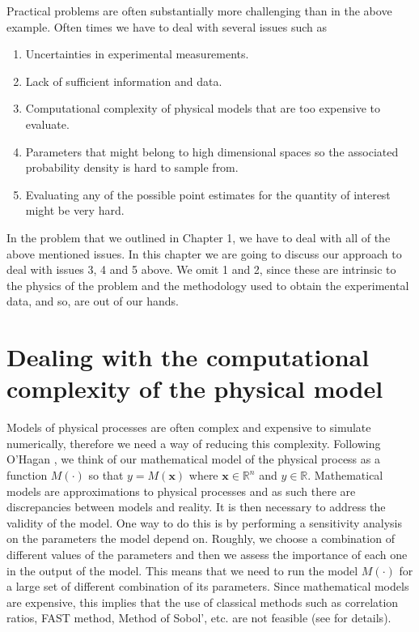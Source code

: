 \documentclass[12pt]{book}
\newcommand{\x}{\textbf{x}}
\begin{document}
Practical problems are often substantially more challenging than in the above example. Often times we have to 
deal with several issues such as 

\begin{enumerate}
\item Uncertainties in experimental measurements.
\item Lack of sufficient information and data.
\item Computational complexity of  physical models that are too expensive to evaluate.
\item Parameters that might belong to high dimensional spaces so the associated probability density is 
hard to sample from.
\item Evaluating any of the possible point estimates for the quantity of interest might be very hard.
\end{enumerate}
In the problem that we outlined in  Chapter 1, we have to deal with all of  the above mentioned issues.
In this chapter we are going to discuss our approach to deal with issues 3, 4 and 5 above. We 
omit 1 and 2, since these  are intrinsic to the physics of the problem and   the methodology used 
to obtain the experimental data, and so, are out of our hands.


\section{Dealing with  the computational complexity of the physical model}
Models of physical processes are often complex and   expensive to simulate numerically, therefore we need
a way of reducing this complexity.
Following O'Hagan  \cite{o2006bayesian}, we think of our  mathematical model of the physical process
 as a function
$M(\cdot)$ so that $y=M(\x)$ where $\x\in\mathbb{R}^{n}$   and $y\in\mathbb{R}$.
Mathematical models are approximations to physical processes and as such there are discrepancies between
models and reality. It is then necessary to address the validity  of the model. One way to do
this is by performing a sensitivity analysis on the parameters the model depend on. Roughly, we choose a
combination of different values of the parameters and then we assess the importance of each one in
the output of the model. This means that we need to run the model $M(\cdot)$ for a large set 
of different combination of its parameters.
Since mathematical models are expensive,
this implies that   the  use of   classical methods such  as correlation
ratios, FAST method, Method of Sobol', etc. 
 are not feasible (see \cite{saltelli2000sensitivity} for details). 
\end{document}
